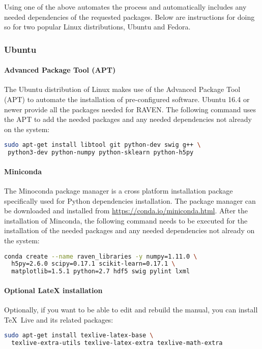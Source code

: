 Using one of the above automates the process and automatically includes any needed
dependencies of the requested packages.  Below are instructions for
doing so for two popular Linux distributions, Ubuntu and Fedora.  

\subsubsection{Ubuntu}

\paragraph{Advanced Package Tool (APT)}
The Ubuntu distribution of Linux makes use of the Advanced Package
Tool (APT) to automate the installation of pre-configured software.
Ubuntu 16.4 or newer provide all the packages needed for RAVEN.  The
following command uses the APT to add the needed packages and any
needed dependencies not already on the system:

\begin{lstlisting}[language=bash]
 sudo apt-get install libtool git python-dev swig g++ \
 python3-dev python-numpy python-sklearn python-h5py
\end{lstlisting}


\paragraph{Miniconda}
The Minoconda package manager is a cross platform installation package specifically 
used for Python dependencies installation.
The package manager can be downloaded and installed from \url{https://conda.io/miniconda.html}.
After the installation of Minconda, the following command needs to be executed for the installation of
the needed packages and any needed dependencies not already on the system:

\begin{lstlisting}[language=bash]
 conda create --name raven_libraries -y numpy=1.11.0 \
  h5py=2.6.0 scipy=0.17.1 scikit-learn=0.17.1 \
  matplotlib=1.5.1 python=2.7 hdf5 swig pylint lxml
\end{lstlisting}

\paragraph{Optional LateX installation}
Optionally, if you want to be able to edit and rebuild the manual, you can
install \TeX~Live and its related packages:
\begin{lstlisting}[language=bash]
  sudo apt-get install texlive-latex-base \
  texlive-extra-utils texlive-latex-extra texlive-math-extra
\end{lstlisting}

